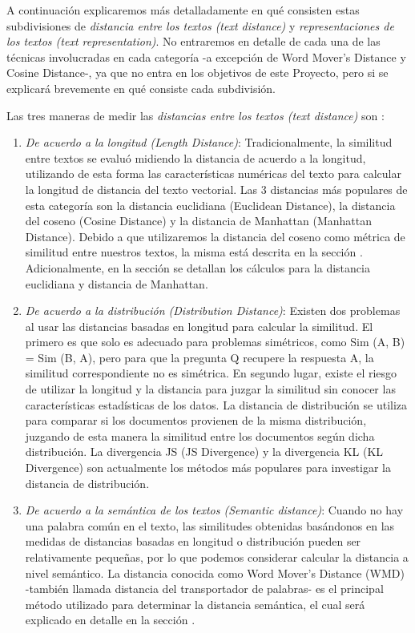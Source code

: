 \documentclass[12pt,a4paper]{article}
\begin{document}
\begin{sloppypar}
A continuación explicaremos más detalladamente en qué consisten estas subdivisiones de \textit{distancia entre los textos (text distance)} y \textit{representaciones de los textos (text representation)}. No entraremos en detalle de cada una de las técnicas involucradas en cada categoría -a excepción de Word Mover’s Distance y Cosine Distance-, ya que no entra en los objetivos de este Proyecto, pero si se explicará brevemente en qué consiste cada subdivisión.

Las tres maneras de medir las \textit{distancias entre los textos (text distance)} son \cite{similarity_survey}: 

\begin{enumerate}

\item \textit{De acuerdo a la longitud (Length Distance)}: Tradicionalmente, la similitud entre textos se evaluó midiendo la distancia de acuerdo a la longitud, utilizando de esta forma las características numéricas del texto para calcular la longitud de distancia del texto vectorial. Las 3 distancias más populares de esta categoría son la distancia euclidiana (Euclidean Distance), la distancia del coseno (Cosine Distance) y la distancia de Manhattan (Manhattan Distance). 
Debido a que utilizaremos la distancia del coseno como métrica de similitud entre nuestros textos, la misma está descrita en la sección \textit{}.
Adicionalmente, en la sección \textit{} se detallan los cálculos para la distancia euclidiana y distancia de Manhattan.

\item \textit{De acuerdo a la distribución (Distribution Distance)}: Existen dos problemas al usar las distancias basadas en longitud para calcular la similitud. El primero es que solo es adecuado para problemas simétricos, como Sim (A, B) = Sim (B, A), pero para que la pregunta Q recupere la respuesta A, la similitud correspondiente no es simétrica. En segundo lugar, existe el riesgo de utilizar la longitud y la distancia para juzgar la similitud sin conocer las características estadísticas de los datos\cite{WMD_2}. 
La distancia de distribución se utiliza para comparar si los documentos provienen de la misma distribución, juzgando de esta manera la similitud entre los documentos según dicha distribución. La divergencia JS (JS Divergence) y la divergencia KL (KL Divergence) son actualmente los métodos más populares para investigar la distancia de distribución.

\item \textit{De acuerdo a la semántica de los textos (Semantic distance)}: Cuando no hay una palabra común en el texto, las similitudes obtenidas basándonos en las medidas de distancias basadas en longitud o distribución pueden ser relativamente pequeñas, por lo que podemos considerar calcular la distancia a nivel semántico. La distancia conocida como Word Mover’s Distance (WMD) -también llamada distancia del transportador de palabras- es el principal método utilizado para determinar la distancia semántica\cite{wmd_paper}, el cual será explicado en detalle en la sección \textit{}.


\end{enumerate}
\end{sloppypar}
\end{document}
